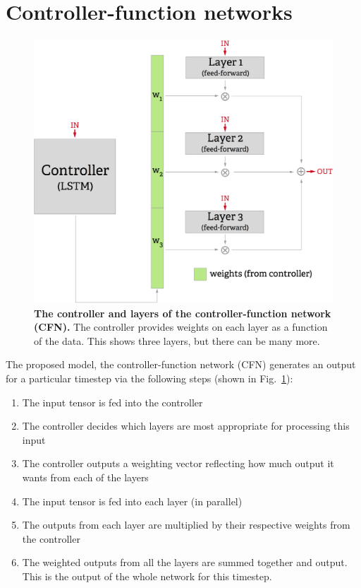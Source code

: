 \documentclass[12pt,twoside]{mitthesis}
\providecommand{\tightlist}{%
  \setlength{\itemsep}{0pt}\setlength{\parskip}{0pt}}
\begin{document}
\section{Controller-function
networks}\label{controller-function-networks}

\begin{figure}[htbp]
\centering
\includegraphics{controller_network_small.png}
\caption{\label{fig:controller_network}\textbf{The controller and layers
of the controller-function network (CFN).} The controller provides
weights on each layer as a function of the data. This shows three
layers, but there can be many more.}
\end{figure}

The proposed model, the controller-function network (CFN) generates an
output for a particular timestep via the following steps (shown in
Fig.~\ref{fig:controller_network}):

\begin{enumerate}
\def\labelenumi{\arabic{enumi}.}
\tightlist
\item
  The input tensor is fed into the controller
\item
  The controller decides which layers are most appropriate for
  processing this input
\item
  The controller outputs a weighting vector reflecting how much output
  it wants from each of the layers
\item
  The input tensor is fed into each layer (in parallel)
\item
  The outputs from each layer are multiplied by their respective weights
  from the controller
\item
  The weighted outputs from all the layers are summed together and
  output. This is the output of the whole network for this timestep.
\end{enumerate}
\end{document}
